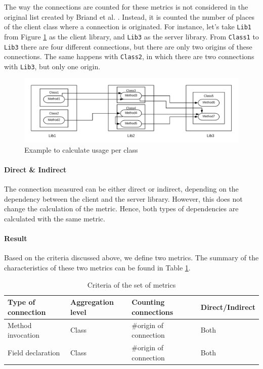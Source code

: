 The way the connections are counted for these metrics is not considered in the original list created by Briand et al. \cite{briand1999unified}. Instead, it is counted the number of places of the client class where a connection is originated. For instance, let's take \texttt{Lib1} from Figure \ref{fig:example-impact-per-class} as the client library, and \texttt{Lib3} as the server library. From \texttt{Class1} to \texttt{Lib3} there are four different connections, but there are only two origins of these connections. The same happens with \texttt{Class2}, in which there are two connections with \texttt{Lib3}, but only one origin.

\begin{figure}[ht]
\begin{center}
\includegraphics[width=\textwidth]{figures/impact-per-class.png}
\caption{Example to calculate usage per class}
\label{fig:example-impact-per-class}
\end{center}
\end{figure}

\paragraph{Direct \& Indirect}

The connection measured can be either direct or indirect, depending on the dependency between the client and the server library. However, this does not change the calculation of the metric. Hence, both types of dependencies are calculated with the same metric.

\paragraph{Result}
Based on the criteria discussed above, we define two metrics. The summary of the characteristics of these two metrics can be found in Table \ref{table:per-class-characteristics}.

\begin{table}[h]
    \begin{center}
    \begin{tabular}{|l|l|l|l|}
    \hline
    Type of connection & Aggregation level & Counting connections & Direct/Indirect \\ \hline
    Method invocation & Class & \#origin of connection & Both \\
    Field declaration & Class & \#origin of connection & Both \\
    \hline
    \end{tabular}
    \end{center}
    \caption{Criteria of the set of metrics}
    \label{table:per-class-characteristics}
\end{table}

